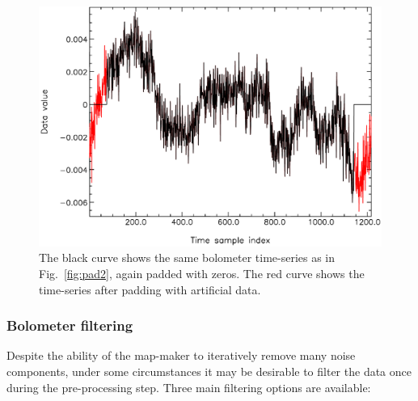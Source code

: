 \documentclass[useAMS,usenatbib,nofootinbib]{mn2e}
\begin{document}
\begin{enumerate}
\begin{figure}
\centering
\includegraphics[width=\linewidth]{pad1.pdf}
\caption{The black curve shows the same bolometer time-series as in
Fig.~\ref{fig:pad2}, again padded with zeros. The red curve shows the
time-series after padding with artificial data.}
\label{fig:pad1}
\end{figure}

\end{enumerate}

\subsubsection{Bolometer filtering}

Despite the ability of the map-maker to iteratively remove many noise
components, under some circumstances it may be desirable to filter the
data once during the pre-processing step. Three main filtering options
are available:
\end{document}
